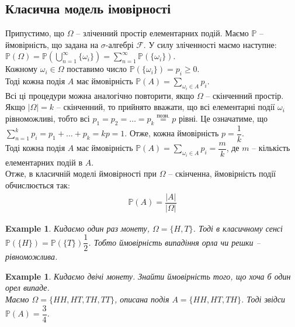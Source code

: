 \documentclass[a4paper, 10pt]{article}
\theoremstyle{theoremdd}
\newtheorem{example}[theorem]{Example}
\begin{document}
\subsection{Класична модель імовірності}
Припустимо, що $\Omega$ -- зліченний простір елементарних подій. Маємо $\mathbb{P}$ -- ймовірність, що задана на $\sigma$-алгебрі $\mathcal{F}$. У силу зліченності маємо наступне:\\
$\mathbb{P}(\Omega) = \displaystyle \mathbb{P}\left( \bigcup_{n=1}^\infty \{\omega_i\} \right) = \sum_{n=1}^\infty \mathbb{P}(\{\omega_i\})$.\\
Кожному $\omega_i \in \Omega$ поставимо число $\mathbb{P}(\{\omega_i\}) = p_i \geq 0$.\\
Тоді кожна подія $A$ має ймовірність $\mathbb{P}(A) = \displaystyle\sum_{\omega_i \in A} p_i$.
\bigskip \\
Всі ці процедури можна аналогічно повторити, якщо $\Omega$ -- скінченний простір.\\
Якщо $|\Omega| = k$ -- скінченний, то прийнято вважати, що всі елементарні події $\omega_i$ рівноможливі, тобто всі $p_1 = p_2 = \dots = p_k \overset{\text{позн.}}{=} p$ рівні. Це означатиме, що $\displaystyle\sum_{n=1}^k p_i = p_1 + \dots + p_k = k p = 1$. Отже, кожна ймовірність $p = \dfrac{1}{k}$.\\
Тоді кожна подія $A$ має ймовірність $\mathbb{P}(A) = \displaystyle\sum_{\omega_i \in A} p_i = \dfrac{m}{k}$, де $m$ -- кількість елементарних подій в $A$.\\
Отже, в класичній моделі ймовірності при $\Omega$ -- скінченна, ймовірність події обчислюється так:
\begin{align*}
\mathbb{P}(A) = \dfrac{|A|}{|\Omega|}
\end{align*}

\begin{example}
Кидаємо один раз монету, $\Omega = \{H,T\}$. Тоді в класичному сенсі $\mathbb{P}(\{H\}) = \mathbb{P}(\{T\}) \dfrac{1}{2}$. Тобто ймовірність випадіння орла чи решки -- рівноможлива.
\end{example}

\begin{example}
Кидаємо двічі монету. Знайти ймовірність того, що хоча б один орел випаде.\\
Маємо $\Omega = \{HH,HT,TH,TT\}$, описана подія $A = \{HH,HT,TH\}$. Тоді звідси $\mathbb{P}(A) = \dfrac{3}{4}$.
\end{example}
\end{document}
